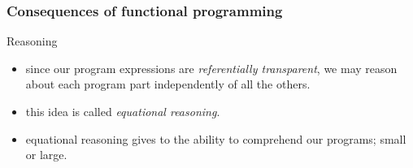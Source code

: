 \begin{frame}
\frametitle{Consequences of functional programming}
\begin{block}{Reasoning}
\begin{itemize}
\item<1-> since our program expressions are \emph{referentially transparent}, we may reason about each program part independently of all the others.
\item<2-> this idea is called \emph{equational reasoning}.
\item<3-> equational reasoning gives to the ability to comprehend our programs; small or large.
\end{itemize}
\end{block}
\end{frame}

